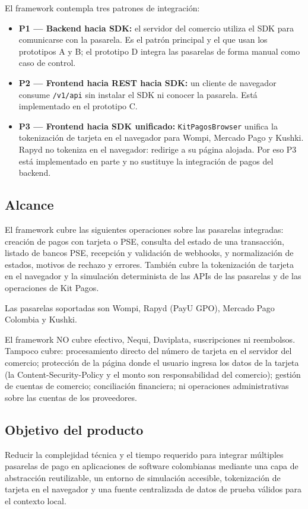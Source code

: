 El framework contempla tres patrones de integración:

\begin{itemize}
  \item \textbf{P1 --- Backend hacia SDK:} el servidor del comercio utiliza el SDK para comunicarse con la pasarela. Es el patrón principal y el que usan los prototipos A y B; el prototipo D integra las pasarelas de forma manual como caso de control.
  \item \textbf{P2 --- Frontend hacia REST hacia SDK:} un cliente de navegador consume \texttt{/v1/api} sin instalar el SDK ni conocer la pasarela. Está implementado en el prototipo C.
  \item \textbf{P3 --- Frontend hacia SDK unificado:} \texttt{KitPagosBrowser} unifica la tokenización de tarjeta en el navegador para Wompi, Mercado Pago y Kushki. Rapyd no tokeniza en el navegador: redirige a su página alojada. Por eso P3 está implementado en parte y no sustituye la integración de pagos del backend.
\end{itemize}

\subsection{Alcance}

El framework cubre las siguientes operaciones sobre las pasarelas integradas: creación de pagos con tarjeta o PSE, consulta del estado de una transacción, listado de bancos PSE, recepción y validación de webhooks, y normalización de estados, motivos de rechazo y errores. También cubre la tokenización de tarjeta en el navegador y la simulación determinista de las APIs de las pasarelas y de las operaciones de Kit Pagos.

Las pasarelas soportadas son Wompi, Rapyd (PayU GPO), Mercado Pago Colombia y Kushki.

El framework NO cubre efectivo, Nequi, Daviplata, suscripciones ni reembolsos. Tampoco cubre: procesamiento directo del número de tarjeta en el servidor del comercio; protección de la página donde el usuario ingresa los datos de la tarjeta (la Content-Security-Policy y el monto son responsabilidad del comercio); gestión de cuentas de comercio; conciliación financiera; ni operaciones administrativas sobre las cuentas de los proveedores.

\subsection{Objetivo del producto}

Reducir la complejidad técnica y el tiempo requerido para integrar múltiples pasarelas de pago en aplicaciones de software colombianas mediante una capa de abstracción reutilizable, un entorno de simulación accesible, tokenización de tarjeta en el navegador y una fuente centralizada de datos de prueba válidos para el contexto local.
